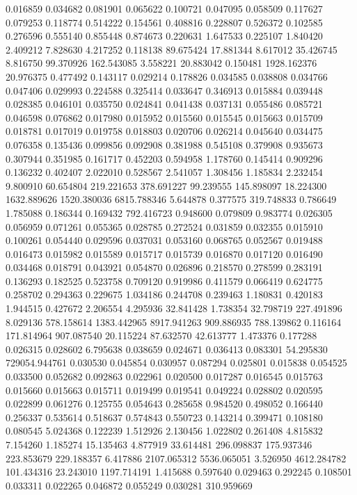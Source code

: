 0.016859
0.034682
0.081901
0.065622
0.100721
0.047095
0.058509
0.117627
0.079253
0.118774
0.514222
0.154561
0.408816
0.228807
0.526372
0.102585
0.276596
0.555140
0.855448
0.874673
0.220631
1.647533
0.225107
1.840420
2.409212
7.828630
4.217252
0.118138
89.675424
17.881344
8.617012
35.426745
8.816750
99.370926
162.543085
3.558221
20.883042
0.150481
1928.162376
20.976375
0.477492
0.143117
0.029214
0.178826
0.034585
0.038808
0.034766
0.047406
0.029993
0.224588
0.325414
0.033647
0.346913
0.015884
0.039448
0.028385
0.046101
0.035750
0.024841
0.041438
0.037131
0.055486
0.085721
0.046598
0.076862
0.017980
0.015952
0.015560
0.015545
0.015663
0.015709
0.018781
0.017019
0.019758
0.018803
0.020706
0.026214
0.045640
0.034475
0.076358
0.135436
0.099856
0.092908
0.381988
0.545108
0.379908
0.935673
0.307944
0.351985
0.161717
0.452203
0.594958
1.178760
0.145414
0.909296
0.136232
0.402407
2.022010
0.528567
2.541057
1.308456
1.185834
2.232454
9.800910
60.654804
219.221653
378.691227
99.239555
145.898097
18.224300
1632.889626
1520.380036
6815.788346
5.644878
0.377575
319.748833
0.786649
1.785088
0.186344
0.169432
792.416723
0.948600
0.079809
0.983774
0.026305
0.056959
0.071261
0.055365
0.028785
0.272524
0.031859
0.032355
0.015910
0.100261
0.054440
0.029596
0.037031
0.053160
0.068765
0.052567
0.019488
0.016473
0.015982
0.015589
0.015717
0.015739
0.016870
0.017120
0.016490
0.034468
0.018791
0.043921
0.054870
0.026896
0.218570
0.278599
0.283191
0.136293
0.182525
0.523758
0.709120
0.919986
0.411579
0.066419
0.624775
0.258702
0.294363
0.229675
1.034186
0.244708
0.239463
1.180831
0.420183
1.944515
0.427672
2.206554
4.295936
32.841428
1.738354
32.798719
227.491896
8.029136
578.158614
1383.442965
8917.941263
909.886935
788.139862
0.116164
171.814964
907.087540
20.115224
87.632570
42.613777
1.473376
0.177288
0.026315
0.028602
6.795638
0.038659
0.024671
0.036413
0.083301
54.295830
729054.944761
0.030530
0.045854
0.030957
0.087294
0.025801
0.015838
0.054525
0.033500
0.052682
0.092863
0.022961
0.020500
0.017287
0.016545
0.015763
0.015660
0.015663
0.015711
0.019499
0.019541
0.049224
0.028802
0.020595
0.022899
0.061276
0.125755
0.054643
0.285658
0.984520
0.498052
0.166440
0.256337
0.535614
0.518637
0.574843
0.550723
0.143214
0.399471
0.108180
0.080545
5.024368
0.122239
1.512926
2.130456
1.022802
0.261408
4.815832
7.154260
1.185274
15.135463
4.877919
33.614481
296.098837
175.937346
223.853679
229.188357
6.417886
2107.065312
5536.065051
3.526950
4612.284782
101.434316
23.243010
1197.714191
1.415688
0.597640
0.029463
0.292245
0.108501
0.033311
0.022265
0.046872
0.055249
0.030281
310.959669
